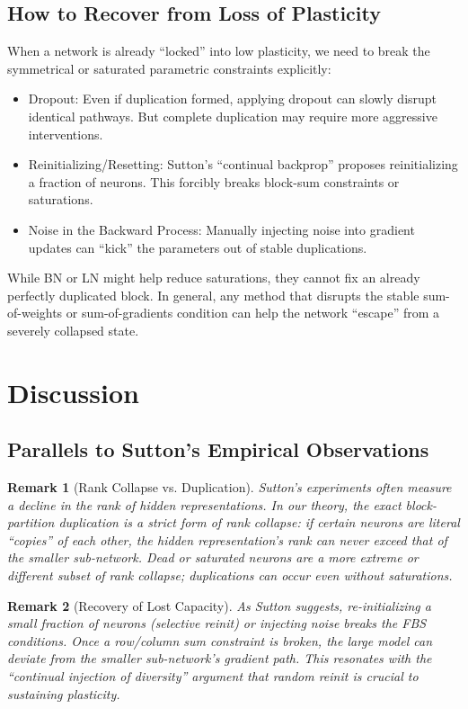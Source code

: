 \documentclass[11pt]{article}
\newtheorem{remark}{Remark}[section]
\begin{document}
\subsection{How to Recover from Loss of Plasticity}
When a network is already ``locked'' into low plasticity, we need to break the symmetrical or saturated parametric constraints explicitly:
\begin{itemize}
    \item Dropout: Even if duplication formed, applying dropout can slowly disrupt identical pathways. But complete duplication may require more aggressive interventions.
    \item Reinitializing/Resetting: Sutton's ``continual backprop'' proposes reinitializing a fraction of neurons. This forcibly breaks block-sum constraints or saturations.
    \item Noise in the Backward Process: Manually injecting noise into gradient updates can ``kick'' the parameters out of stable duplications.
\end{itemize}
While BN or LN might help reduce saturations, they cannot fix an already perfectly duplicated block. In general, any method that disrupts the stable sum-of-weights or sum-of-gradients condition can help the network ``escape'' from a severely collapsed state.

\section{Discussion}

\subsection{Parallels to Sutton's Empirical Observations}

\begin{remark}[Rank Collapse vs. Duplication]
Sutton's experiments often measure a decline in the rank of hidden representations. In our theory, the exact block-partition duplication is a strict form of rank collapse: if certain neurons are literal ``copies'' of each other, the hidden representation's rank can never exceed that of the smaller sub-network. Dead or saturated neurons are a more extreme or different subset of rank collapse; duplications can occur even without saturations.
\end{remark}

\begin{remark}[Recovery of Lost Capacity]
As Sutton suggests, re-initializing a small fraction of neurons (selective reinit) or injecting noise breaks the FBS conditions. Once a row/column sum constraint is broken, the large model can deviate from the smaller sub-network's gradient path. This resonates with the ``continual injection of diversity'' argument that random reinit is crucial to sustaining plasticity.
\end{remark}
\end{document}
